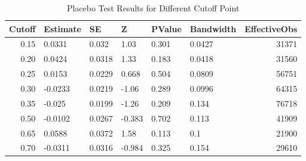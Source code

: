 \begin{table}[ht]
\centering
\caption{Placebo Test Results for Different Cutoff Point} 
\label{tab:movement_cutoff}
\begin{tabular}{rlllllr}
  \hline
Cutoff & Estimate & SE & Z & PValue & Bandwidth & EffectiveObs \\ 
  \hline
0.15 & 0.0331 & 0.032 & 1.03 & 0.301 & 0.0427 & 31371 \\ 
  0.20 & 0.0424 & 0.0318 & 1.33 & 0.183 & 0.0418 & 31560 \\ 
  0.25 & 0.0153 & 0.0229 & 0.668 & 0.504 & 0.0809 & 56751 \\ 
  0.30 & -0.0233 & 0.0219 & -1.06 & 0.289 & 0.0996 & 64315 \\ 
  0.35 & -0.025 & 0.0199 & -1.26 & 0.209 & 0.134 & 76718 \\ 
  0.50 & -0.0102 & 0.0267 & -0.383 & 0.702 & 0.113 & 41909 \\ 
  0.65 & 0.0588 & 0.0372 & 1.58 & 0.113 & 0.1 & 21900 \\ 
  0.70 & -0.0311 & 0.0316 & -0.984 & 0.325 & 0.154 & 29610 \\ 
   \hline
\end{tabular}
\end{table}

